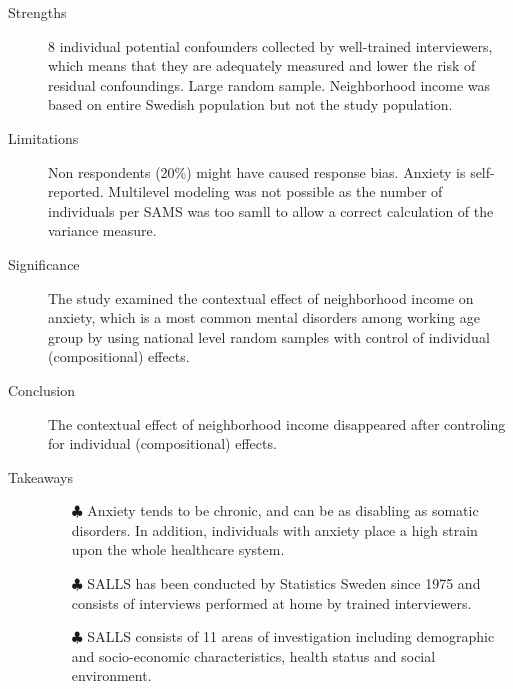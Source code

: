 \documentclass{article}
\begin{document}
\begin{itemize}
\begin{description}
			\item[Strengths] 
				8 individual potential confounders collected by well-trained interviewers, which means that they are adequately measured and lower the risk of residual confoundings. Large random sample. Neighborhood income was based on entire Swedish population but not the study population.
			\item[Limitations] 
				Non respondents (20\%) might have caused response bias. Anxiety is self-reported. Multilevel modeling was not possible as the number of individuals per SAMS was too samll to allow a correct calculation of the variance measure.
			\item[Significance] 
				The study examined the contextual effect of neighborhood income on anxiety, which is a most common mental disorders among working age group by using national level random samples with control of individual (compositional) effects.
			\item[Conclusion] 
				The contextual effect of neighborhood income disappeared after controling for individual (compositional) effects.
			\item[Takeaways] \mbox{}\par
				\begin{itemize}
					\item[$\clubsuit$] Anxiety tends to be chronic, and can be as disabling as somatic disorders. In addition, individuals with anxiety place a high strain upon the whole healthcare system.
					\item[$\clubsuit$] SALLS has been conducted by Statistics Sweden since 1975 and consists of interviews performed at home by trained interviewers.
					\item[$\clubsuit$] SALLS consists of 11 areas of investigation including demographic and socio-economic characteristics, health status and social environment.
				\end{itemize}
		\end{description}
\end{itemize} %

\end{document}
